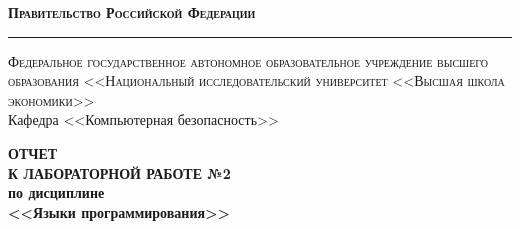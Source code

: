 \documentclass[a4paper,12pt]{article}
\begin{document}
\begin{titlepage}		

\begin{center}
	\textsc{\textbf{Правительство Российской Федерации}}\\
	\vspace{0.5cm}
	\hrule
	\vspace{0.5cm}
	\textsc{Федеральное государственное автономное образовательное учреждение высшего образования <<Национальный исследовательский университет <<Высшая школа экономики>>}\\
	\vspace{1cm}
	Кафедра <<Компьютерная безопасность>>
\end{center}	

\vspace{\fill}

\begin{center}
	\Large{\textbf{ОТЧЕТ \\ К ЛАБОРАТОРНОЙ РАБОТЕ №2}} \\
	\vspace{1em}
	\textbf{по дисциплине} \\
	\vspace{1em}
	\large{\textbf{<<Языки программирования>>}}
\end{center}

\vspace{\fill}


\end{titlepage}
\end{document}
